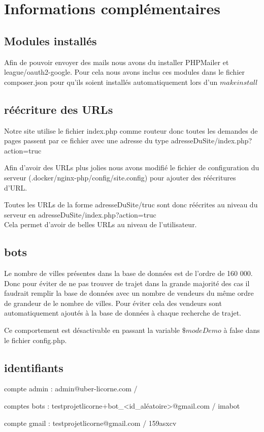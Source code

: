\documentclass{article}
\begin{document}
\section{Informations complémentaires}
    \subsection{Modules installés}
        Afin de pouvoir envoyer des mails nous avons du installer PHPMailer et league/oauth2-google. Pour cela nous avons inclus ces modules dans le fichier composer.json pour qu'ils soient installés automatiquement lors d'un $make install$
        
    \subsection{réécriture des URLs}
        Notre site utilise le fichier index.php comme routeur donc toutes les demandes de pages passent par ce fichier avec une adresse du type adresseDuSite/index.php?action=truc
        
        Afin d'avoir des URLs plus jolies nous avons modifié le fichier de configuration du serveur (.docker/nginx-php/config/site.config) pour ajouter des réécritures d'URL.
        
        Toutes les URLs de la forme adresseDuSite/truc sont donc réécrites au niveau du serveur en adresseDuSite/index.php?action=truc
        \\
        
        Cela permet d'avoir de belles URLs au niveau de l'utilisateur.
        
    \subsection{bots}
        Le nombre de villes présentes dans la base de données est de l'ordre de 160 000. Donc pour éviter de ne pas trouver de trajet dans la grande majorité des cas il faudrait remplir la base de données avec un nombre de vendeurs du même ordre de grandeur de le nombre de villes. Pour éviter cela des vendeurs sont automatiquement ajoutés à la base de données à chaque recherche de trajet.
        
        Ce comportement est désactivable en passant la variable $\$modeDemo$ à false dans le fichier config.php.
        
    \subsection{identifiants}
        compte admin : admin@uber-licorne.com / 
        
        comptes bots : testprojetlicorne+bot_<id_aléatoire>@gmail.com / imabot
        
        compte gmail : testprojetlicorne@gmail.com / 159asxcv
        
\end{document}
